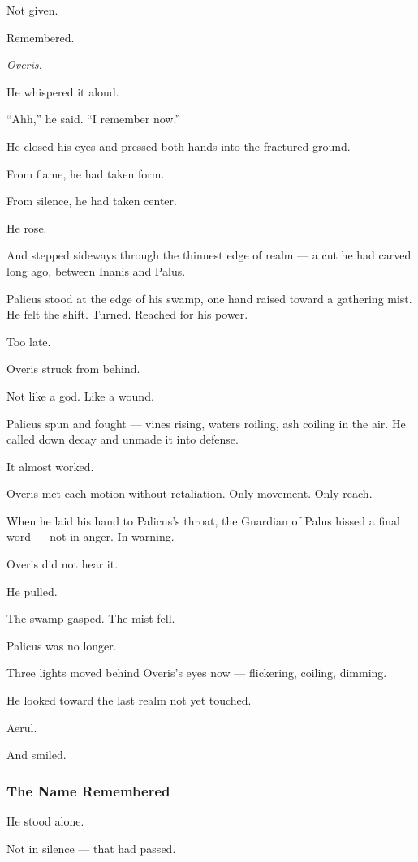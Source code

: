 \documentclass[12pt]{article}
\begin{document}
Not given.

Remembered.

\emph{Overis.}

He whispered it aloud.

``Ahh,'' he said. ``I remember now.''

He closed his eyes and pressed both hands into the fractured ground.

From flame, he had taken form.

From silence, he had taken center.

He rose.

And stepped sideways through the thinnest edge of realm — a cut he had carved long ago, between Inanis and Palus.

Palicus stood at the edge of his swamp, one hand raised toward a gathering mist. He felt the shift. Turned. Reached for his power.

Too late.

Overis struck from behind.

Not like a god. Like a wound.

Palicus spun and fought — vines rising, waters roiling, ash coiling in the air. He called down decay and unmade it into defense.

It almost worked.

Overis met each motion without retaliation. Only movement. Only reach.

When he laid his hand to Palicus’s throat, the Guardian of Palus hissed a final word — not in anger. In warning.

Overis did not hear it.

He pulled.

The swamp gasped. The mist fell.

Palicus was no longer.

Three lights moved behind Overis’s eyes now — flickering, coiling, dimming.

He looked toward the last realm not yet touched.

Aerul.

And smiled.

\dotfill

\subsubsection*{The Name Remembered}

He stood alone.

Not in silence — that had passed.
\end{document}
